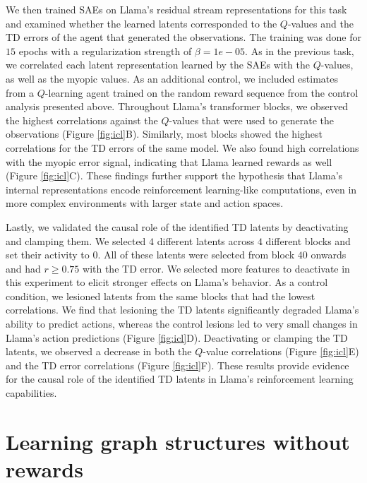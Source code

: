 \documentclass{article} %
\begin{document}
We then trained SAEs on Llama's residual stream representations for this task and examined whether the learned latents corresponded to the $Q$-values and the TD errors of the agent that generated the observations. The training was done for $15$ epochs with a regularization strength of $\beta=1e-05$. As in the previous task, we correlated each latent representation learned by the SAEs with the $Q$-values, as well as the myopic values. As an additional control, we included estimates from a $Q$-learning agent trained on the random reward sequence from the control analysis presented above. Throughout Llama's transformer blocks, we observed the highest correlations against the $Q$-values that were used to generate the observations (Figure \ref{fig:icl}B). Similarly, most blocks showed the highest correlations for the TD errors of the same model. We also found high correlations with the myopic error signal, indicating that Llama learned rewards as well (Figure \ref{fig:icl}C). These findings further support the hypothesis that Llama's internal representations encode reinforcement learning-like computations, even in more complex environments with larger state and action spaces.

Lastly, we validated the causal role of the identified TD latents by deactivating and clamping them. We selected $4$ different latents across $4$ different blocks and set their activity to $0$. All of these latents were selected from block $40$ onwards and had $r \geq 0.75$ with the TD error. We selected more features to deactivate in this experiment to elicit stronger effects on Llama's behavior. As a control condition, we lesioned latents from the same blocks that had the lowest correlations. We find that lesioning the TD latents significantly degraded Llama's ability to predict actions, whereas the control lesions led to very small changes in Llama's action predictions (Figure \ref{fig:icl}D). Deactivating or clamping the TD latents, we observed a decrease in both the $Q$-value correlations (Figure \ref{fig:icl}E) and the TD error correlations (Figure \ref{fig:icl}F). These results provide evidence for the causal role of the identified TD latents in Llama's reinforcement learning capabilities.

\section{Learning graph structures without rewards}
\end{document}
